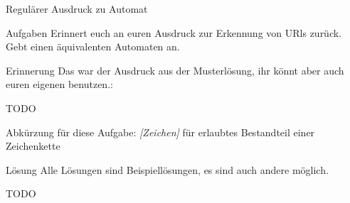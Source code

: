 {
\begin{frame}{Regulärer Ausdruck zu Automat}
    \begin{alertblock}{Aufgaben}
        Erinnert euch an euren Ausdruck zur Erkennung von URls zurück. Gebt einen äquivalenten Automaten an.
    \end{alertblock}
    \begin{exampleblock}{Erinnerung}
        Das war der Ausdruck aus der Musterlösung, ihr könnt aber auch euren eigenen benutzen.:

        TODO

    \end{exampleblock}
    \footnotesize{Abkürzung für diese Aufgabe: \emph{[Zeichen]} für erlaubtes Bestandteil einer Zeichenkette}
\end{frame}
}

{
\begin{frame}{Lösung}
    Alle Lösungen sind Beispiellösungen, es sind auch andere möglich.

    TODO

\end{frame}
}